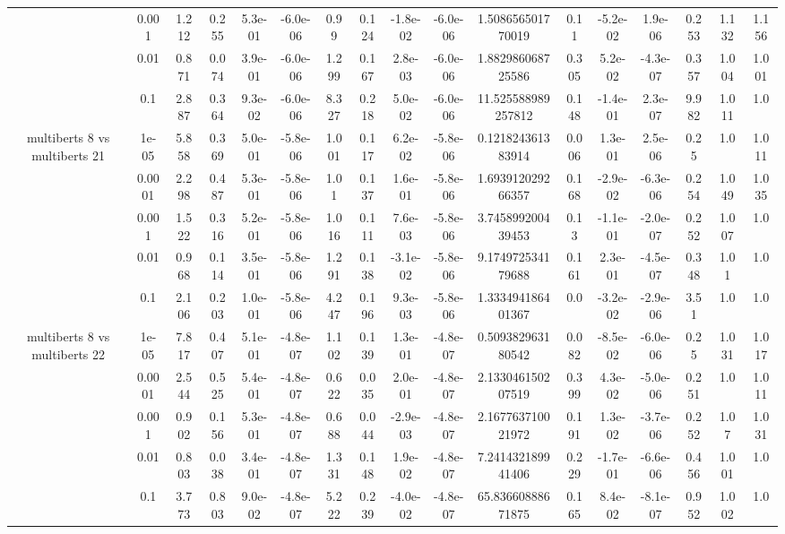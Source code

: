 \begin{tabular}{|c|c|c|c|c|c|c|c|c|c|c|c|c|c|c|c|c|}
 & 0.001 & 1.212 & 0.255 & 5.3e-01 & -6.0e-06 & 0.99 & 0.124 & -1.8e-02 & -6.0e-06 & 1.508656501770019 & 0.11 & -5.2e-02 & 1.9e-06 & 0.253 & 1.132 & 1.156 \\
 & 0.01 & 0.871 & 0.074 & 3.9e-01 & -6.0e-06 & 1.299 & 0.167 & 2.8e-03 & -6.0e-06 & 1.882986068725586 & 0.305 & 5.2e-02 & -4.3e-07 & 0.357 & 1.004 & 1.001 \\
 & 0.1 & 2.887 & 0.364 & 9.3e-02 & -6.0e-06 & 8.327 & 0.218 & 5.0e-02 & -6.0e-06 & 11.525588989257812 & 0.148 & -1.4e-01 & 2.3e-07 & 9.982 & 1.011 & 1.0 \\
\hline
\multirow{5}{*}{multiberts 8 vs multiberts 21} & 1e-05 & 5.858 & 0.369 & 5.0e-01 & -5.8e-06 & 1.001 & 0.117 & 6.2e-02 & -5.8e-06 & 0.121824361383914 & 0.006 & 1.3e-01 & 2.5e-06 & 0.25 & 1.0 & 1.011 \\
 & 0.0001 & 2.298 & 0.487 & 5.3e-01 & -5.8e-06 & 1.01 & 0.137 & 1.6e-01 & -5.8e-06 & 1.693912029266357 & 0.168 & -2.9e-02 & -6.3e-06 & 0.254 & 1.049 & 1.035 \\
 & 0.001 & 1.522 & 0.316 & 5.2e-01 & -5.8e-06 & 1.016 & 0.111 & 7.6e-03 & -5.8e-06 & 3.745899200439453 & 0.13 & -1.1e-01 & -2.0e-07 & 0.252 & 1.007 & 1.0 \\
 & 0.01 & 0.968 & 0.114 & 3.5e-01 & -5.8e-06 & 1.291 & 0.138 & -3.1e-02 & -5.8e-06 & 9.174972534179688 & 0.161 & 2.3e-01 & -4.5e-07 & 0.348 & 1.01 & 1.0 \\
 & 0.1 & 2.106 & 0.203 & 1.0e-01 & -5.8e-06 & 4.247 & 0.196 & 9.3e-03 & -5.8e-06 & 1.333494186401367 & 0.0 & -3.2e-02 & -2.9e-06 & 3.51 & 1.0 & 1.0 \\
\hline
\multirow{5}{*}{multiberts 8 vs multiberts 22} & 1e-05 & 7.817 & 0.407 & 5.1e-01 & -4.8e-07 & 1.102 & 0.139 & 1.3e-01 & -4.8e-07 & 0.509382963180542 & 0.082 & -8.5e-02 & -6.0e-06 & 0.25 & 1.031 & 1.017 \\
 & 0.0001 & 2.544 & 0.525 & 5.4e-01 & -4.8e-07 & 0.622 & 0.035 & 2.0e-01 & -4.8e-07 & 2.133046150207519 & 0.399 & 4.3e-02 & -5.0e-06 & 0.251 & 1.0 & 1.011 \\
 & 0.001 & 0.902 & 0.156 & 5.3e-01 & -4.8e-07 & 0.688 & 0.044 & -2.9e-03 & -4.8e-07 & 2.167763710021972 & 0.191 & 1.3e-02 & -3.7e-06 & 0.252 & 1.07 & 1.031 \\
 & 0.01 & 0.803 & 0.038 & 3.4e-01 & -4.8e-07 & 1.331 & 0.148 & 1.9e-02 & -4.8e-07 & 7.241432189941406 & 0.229 & -1.7e-01 & -6.6e-06 & 0.456 & 1.001 & 1.0 \\
 & 0.1 & 3.773 & 0.803 & 9.0e-02 & -4.8e-07 & 5.222 & 0.239 & -4.0e-02 & -4.8e-07 & 65.83660888671875 & 0.165 & 8.4e-02 & -8.1e-07 & 0.952 & 1.002 & 1.0 \\

\end{tabular}
